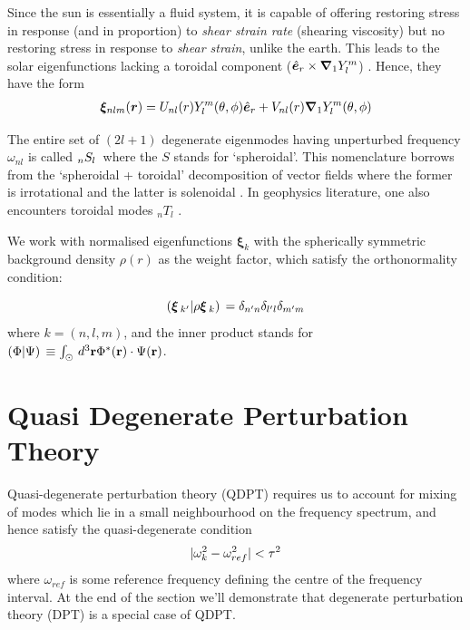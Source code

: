 Since the sun is essentially a fluid system, it is capable of offering restoring stress in response (and in proportion) to \textit{shear strain rate} (shearing viscosity) but no restoring stress in response to \textit{shear strain}, unlike the earth. This leads to the solar eigenfunctions lacking a toroidal component ($\hat{\bm{e}}_{r}\times \bm{\nabla}_1 Y_{l}^m$) \cite{jcd_notes}. Hence, they have the form
\begin{eqnarray} \label{eqn: xi_exp}
    \boldsymbol{\xi}_{nlm}(\boldsymbol{r}) =  U_{nl}(r) Y_l^m(\theta,\phi) \hat{\bm{e}}_{r}
 + V_{nl}(r) \boldsymbol{\nabla}_1 Y_l^m(\theta,\phi)
\end{eqnarray}
 
The entire set of $(2l+1)$ degenerate \snr eigenmodes having unperturbed frequency $\omega_{nl}$ is called $_{n}S_{l}\,$ where the $S$ stands for `spheroidal'. This nomenclature borrows from the `spheroidal + toroidal' decomposition of vector fields where the former is irrotational and the latter is solenoidal \cite{lavely92}. In geophysics literature, one also encounters toroidal modes $_nT_l$ \cite{DT98}.

We work with normalised eigenfunctions $\boldsymbol{\xi}_k$ with the spherically symmetric background density $\rho(r)$ as the weight factor, which satisfy the orthonormality condition:

\begin{equation} \label{eqn: orthonormality}
  (\bm{\xi}\,_{k'}|\rho\bm{\xi}\,_{k})\, = \delta_{n'n} \delta_{l' l} \delta_{m' m}  
\end{equation}
where $k = (n,l,m)$, and the inner product \inner{}{} stands for $(\Phi|\Psi)\, \equiv \int_{\odot} \, d^3\mathbf{r} \Phi^*(\mathbf{r})\cdot \Psi(\mathbf{r})$.

\section{Quasi Degenerate Perturbation Theory}
Quasi-degenerate perturbation theory (QDPT) requires us to account for mixing of modes which lie in a small neighbourhood on the frequency spectrum, and hence satisfy the quasi-degenerate condition
\begin{equation}\label{eqn:qdpt_cond}
|\omega_k^2 - \omega_{ref}^2| < \tau^2
\end{equation}
where $\omega_{ref}$ is some reference frequency defining the centre of the frequency interval. At the end of the section we'll demonstrate that degenerate perturbation theory (DPT) is a special case of QDPT.

